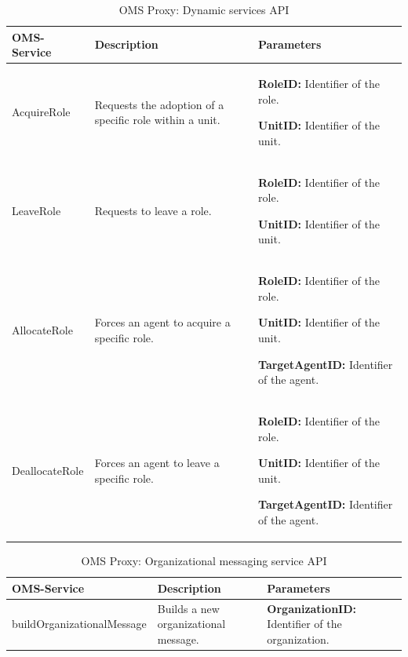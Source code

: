 \begin{table}[h!t]
\begin{tabular}{|l|p{5cm}|p{5cm}|}
\hline
OMS-Service & Description & Parameters \\ \hline
AcquireRole & Requests the adoption of a specific role within a unit.
 &

\textbf{RoleID:} Identifier of the role.

\textbf{
UnitID:} Identifier of the unit.

\\ \hline
LeaveRole & Requests to leave a role.
&

\textbf{RoleID:} Identifier of the role.

\textbf{UnitID:} Identifier of the unit.

\\ \hline

AllocateRole & Forces an agent to acquire a specific role.
 &

\textbf{RoleID:} Identifier of the role.

\textbf{UnitID:} Identifier of the unit.

\textbf{TargetAgentID:} Identifier of the agent.
 \\ \hline

DeallocateRole & Forces an agent to leave a specific role.
 &

\textbf{RoleID:} Identifier of the role.

\textbf{UnitID:} Identifier of the unit.

\textbf{TargetAgentID:} Identifier of the agent.
 \\ \hline
\end{tabular}
\caption{OMS Proxy: Dynamic services API}
\label{tab:thomas_OMSProxy_compound}
\end{table}


\begin{table}[h!t]
\begin{tabular}{|l|p{3cm}|p{5cm}|}
\hline
OMS-Service & Description & Parameters \\ \hline
buildOrganizationalMessage & Builds a new organizational message.
 &
\textbf{OrganizationID:} Identifier of the organization.
 \\ \hline
\end{tabular}
\caption{OMS Proxy: Organizational messaging service API}
\label{tab:thomas_OMSProxy_messaging}
\end{table}





